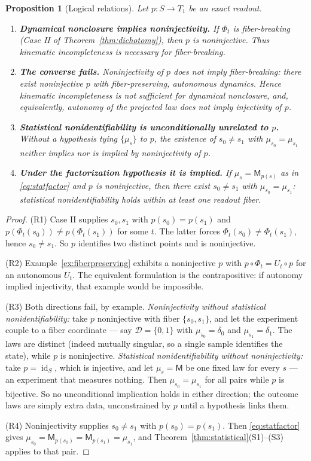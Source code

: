 \documentclass[11pt,reqno]{amsart}
\theoremstyle{plain}
\newtheorem{proposition}[theorem]{Proposition}
\theoremstyle{definition}
\theoremstyle{remark}
\DeclareMathOperator{\id}{id}
\begin{document}
\begin{proposition}[Logical relations]\label{prop:relations}
Let $p\colon S\to T_1$ be an exact readout.
\begin{enumerate}
\item[(R1)] \textbf{Dynamical nonclosure implies noninjectivity.} If $\Phi_t$ is fiber-breaking (Case II of Theorem~\ref{thm:dichotomy}), then $p$ is noninjective. Thus kinematic incompleteness is \emph{necessary} for fiber-breaking.
\item[(R2)] \textbf{The converse fails.} Noninjectivity of $p$ does not imply fiber-breaking: there exist noninjective $p$ with fiber-preserving, autonomous dynamics. Hence kinematic incompleteness is \emph{not sufficient} for dynamical nonclosure, and, equivalently, autonomy of the projected law does not imply injectivity of $p$.
\item[(R3)] \textbf{Statistical nonidentifiability is unconditionally unrelated to $p$.} Without a hypothesis tying $\{\mu_s\}$ to $p$, the existence of $s_0\neq s_1$ with $\mu_{s_0}=\mu_{s_1}$ neither implies nor is implied by noninjectivity of $p$.
\item[(R4)] \textbf{Under the factorization hypothesis it is implied.} If $\mu_s=\mathsf M_{p(s)}$ as in \eqref{eq:statfactor} and $p$ is noninjective, then there exist $s_0\neq s_1$ with $\mu_{s_0}=\mu_{s_1}$: statistical nonidentifiability holds within at least one readout fiber.
\end{enumerate}
\end{proposition}

\begin{proof}
(R1) Case II supplies $s_0,s_1$ with $p(s_0)=p(s_1)$ and $p(\Phi_t(s_0))\neq p(\Phi_t(s_1))$ for some $t$. The latter forces $\Phi_t(s_0)\neq\Phi_t(s_1)$, hence $s_0\neq s_1$. So $p$ identifies two distinct points and is noninjective.

(R2) Example~\ref{ex:fiberpreserving} exhibits a noninjective $p$ with $p\circ\Phi_t=U_t\circ p$ for an autonomous $U_t$. The equivalent formulation is the contrapositive: if autonomy implied injectivity, that example would be impossible.

(R3) Both directions fail, by example. \emph{Noninjectivity without statistical nonidentifiability:} take $p$ noninjective with fiber $\{s_0,s_1\}$, and let the experiment couple to a fiber coordinate --- say $\mathcal D=\{0,1\}$ with $\mu_{s_0}=\delta_0$ and $\mu_{s_1}=\delta_1$. The laws are distinct (indeed mutually singular, so a single sample identifies the state), while $p$ is noninjective. \emph{Statistical nonidentifiability without noninjectivity:} take $p=\id_S$, which is injective, and let $\mu_s=\mathsf M$ be one fixed law for every $s$ --- an experiment that measures nothing. Then $\mu_{s_0}=\mu_{s_1}$ for all pairs while $p$ is bijective. So no unconditional implication holds in either direction; the outcome laws are simply extra data, unconstrained by $p$ until a hypothesis links them.

(R4) Noninjectivity supplies $s_0\neq s_1$ with $p(s_0)=p(s_1)$. Then \eqref{eq:statfactor} gives $\mu_{s_0}=\mathsf M_{p(s_0)}=\mathsf M_{p(s_1)}=\mu_{s_1}$, and Theorem~\ref{thm:statistical}(S1)--(S3) applies to that pair.
\end{proof}
\end{document}
